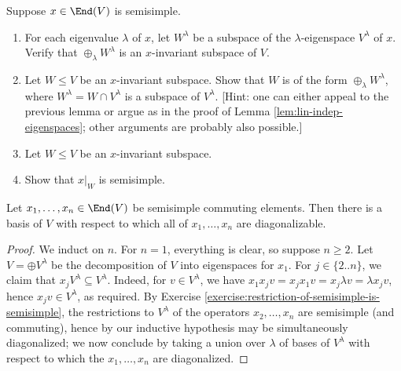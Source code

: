 \documentclass[reqno]{amsart} 
\begin{document}
\begin{exercise}\label{exercise:restriction-of-semisimple-is-semisimple}
  Suppose $x \in \End(V)$ is semisimple.
  \begin{enumerate}
  \item For each eigenvalue $\lambda$ of $x$, let $W^\lambda$ be a subspace of the $\lambda$-eigenspace $V^\lambda$ of $x$.  Verify that $\oplus_{\lambda} W^\lambda$ is an $x$-invariant subspace of $V$.
  \item Let $W \leq V$ be an $x$-invariant subspace.  Show that $W$ is of the form $\oplus_{\lambda} W^\lambda$, where $W^\lambda = W \cap V^\lambda$ is a subspace of $V^\lambda$.  [Hint: one can either appeal to the previous lemma or argue as in the proof of Lemma \ref{lem:lin-indep-eigenspaces}; other arguments are probably also possible.]
  \item Let $W \leq V$ be an $x$-invariant subspace.
  \item Show that $x|_W$ is semisimple.
  \end{enumerate}
\end{exercise}


\begin{theorem}\label{thm:commuting-semisimple-operators}
  Let $x_1,\dotsc,x_n \in \End(V)$ be semisimple commuting elements.  Then there is a basis of $V$ with respect to which all of $x_1,\dotsc,x_n$ are diagonalizable.
\end{theorem}
\begin{proof}
  We induct on $n$.  For $n = 1$, everything is clear, so suppose $n \geq 2$.  Let $V = \oplus V^\lambda$ be the decomposition of $V$ into eigenspaces for $x_1$.  For $j \in \{2..n\}$, we claim that $x_j V^\lambda \subseteq V^\lambda$.  Indeed, for $v \in V^\lambda$, we have $x_1 x_j v = x_j x_1 v = x_j \lambda v = \lambda x_j v$, hence $x_j v \in V^\lambda$, as required.  By Exercise \ref{exercise:restriction-of-semisimple-is-semisimple}, the restrictions to $V^\lambda$ of the operators $x_2,\dotsc,x_n$ are semisimple (and commuting), hence by our inductive hypothesis may be simultaneously diagonalized; we now conclude by taking a union over $\lambda$ of bases of $V^\lambda$ with respect to which the $x_1,\dotsc,x_n$ are diagonalized.
\end{proof}
\end{document}

